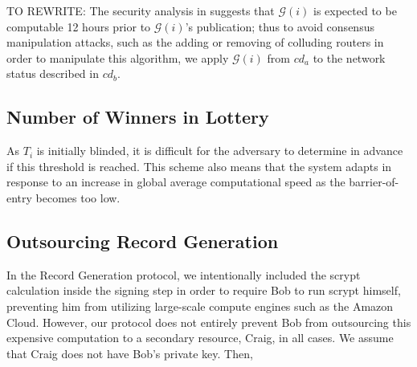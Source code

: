 \documentclass[USenglish,oneside,twocolumn]{article}
\begin{document}
 TO REWRITE: The security analysis in \cite{GouletCommitReveal} suggests that $ \mathcal{G}(i) $ is expected to be computable 12 hours prior to $ \mathcal{G}(i) $'s publication; thus to avoid consensus manipulation attacks, such as the adding or removing of colluding routers in order to manipulate this algorithm, we apply $ \mathcal{G}(i) $ from $ \mathit{cd}_{a} $ to the network status described in $ \mathit{cd}_{b} $.
\subsection{Number of Winners in Lottery}
\label{sec:lotteryWinners}

 As $ T_{i} $ is initially blinded, it is difficult for the adversary to determine in advance if this threshold is reached. This scheme also means that the system adapts in response to an increase in global average computational speed as the barrier-of-entry becomes too low.

\subsection{Outsourcing Record Generation}

In the Record Generation protocol, we intentionally included the scrypt calculation inside the signing step in order to require Bob to run scrypt himself, preventing him from utilizing large-scale compute engines such as the Amazon Cloud. However, our protocol does not entirely prevent Bob from outsourcing this expensive computation to a secondary resource, Craig, in all cases. We assume that Craig does not have Bob's private key. Then,
\end{document}
